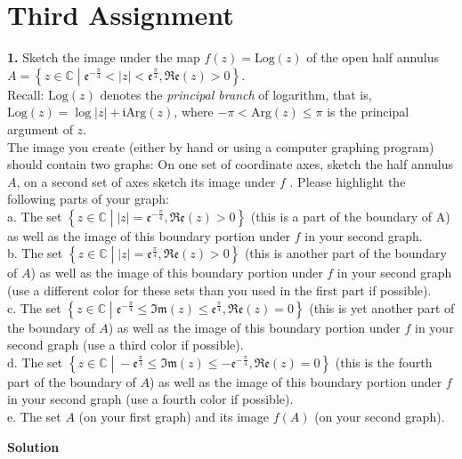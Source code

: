 \documentclass[11pt]{amsart}
\newcommand{\dsp}{\displaystyle}
\newcommand{\BBC}{\mathbb{C}}\newcommand{\mi}{\mathfrak{i}}
\begin{document}
\section{Third Assignment}
\textbf{1.} Sketch the image under the map $f(z)=\textrm{Log}(z)$ of the open half annulus 
$\dsp A=\left\{z\in\BBC\;\left| 
\;\mathfrak{e}^{-\frac{\pi}{4}}<|z|<\mathfrak{e}^{\frac{\pi}{4}},\mathfrak{Re}
(z)>0\right.\right\} $.\\Recall: $\textrm{Log}(z)$ denotes the \textit{principal branch} 
of logarithm, that is, $\textrm{Log}(z)=\log|z|+\mi\textrm{Arg}(z)$, 
where $\dsp -\pi<\textrm{Arg}(z)\leq \pi$ is the principal argument of $z$.\\
The image you create (either by hand or using a computer graphing program) should contain two graphs: On one set of 
coordinate axes, sketch the half annulus $A$, on a second set of axes sketch its image 
under $f$ . Please highlight the following 
parts of your graph:\\
a. The set $\dsp \left\{z\in\BBC\;\left|\;|z| =\mathfrak{e}^{-\frac{\pi}{4}}, 
\mathfrak{Re}(z)>0\right.\right\}$ (this is a part of the boundary
of A) as well as the image of this boundary portion under $f$ in your second graph.\\
b. The set $\dsp \left\{z\in\BBC\;\left|\;|z| 
=\mathfrak{e}^{\frac{\pi}{4}},\mathfrak{Re}(z)>0\right.\right\}$ (this is another part of 
the 
boundary of $A$) as well as the image of this boundary portion under $f$ in your second 
graph (use a different color for these sets 
than you used in the first part if possible).\\
c. The set $\left\{z \in 
\BBC\;\left|\;\mathfrak{e}^{-\frac{\pi}{4}}\leq\mathfrak{Im}(z)\leq\mathfrak{e}^{\frac{\pi
} { 4 } }, \mathfrak{Re}(z)=0\right.\right\}$ (this is yet another part of the boundary 
of $A$) as well as the image of this 
boundary portion under $f$ in your second 
graph (use a third color if possible).\\
d. The set $\dsp \left\{z \in \BBC\;\left|\;-\mathfrak{e}^{\frac{\pi}{4}}\leq 
\mathfrak{Im}(z)\leq-\mathfrak{e}^{-\frac{\pi}{4}},
\mathfrak{Re}(z) = 0\right.\right\}$ (this is the fourth part of the boundary of $A$) as 
well 
as the image of this boundary portion under 
$f$ in your second graph (use a fourth color if possible).\\
e. The set $A$ (on your first graph) and its image $f(A)$ (on your second graph).
\begin{center}
\textbf{Solution}
\end{center}
\end{document}
